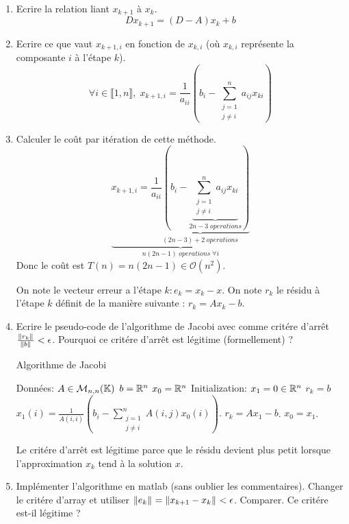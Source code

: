 \documentclass[a4paper,10pt]{article}
\begin{document}
\begin{enumerate}
    \item Ecrire la relation liant $x_{k+1}$ à $x_k$.
\[
Dx_{k + 1} = (D - A)x_k + b
\]

    \item Ecrire ce que vaut $x_{k+1,i}$ en fonction de $x_{k,i}$ (où $x_{k,i}$ représente la
composante $i$ à l'étape $k$).
\[
\forall i \in \llbracket 1, n \rrbracket, \;
x_{k + 1, i} = \frac{1}{a_{ii}}\left( b_i -
\sum_{\substack{
   j = 1 \\
   j \neq i
  }}^n a_{ij} x_{ki} \right)
\]

    \item Calculer le coût par itération de cette méthode.
\[
\underbrace{x_{k + 1, i} = \underbrace{\frac{1}{a_{ii}}\left( b_i -
\underbrace{\sum_{\substack{
   j = 1 \\
   j \neq i
  }}^n a_{ij} x_{ki}}_{2n - 3\; operations} \right)}_{(2n - 3) + 2\; operations}
}_{n(2n - 1)\; operations\; \forall i}
\]
Donc le coût est $T(n) = n (2n - 1) \in \mathcal{O}(n^2)$.

\hbox{}

On note le vecteur erreur a l’étape $k : e_k = x_k − x$. On note $r_k$ le résidu à l’étape $k$
définit de la manière suivante : $r_k = Ax_k − b$.

    \item Ecrire le pseudo-code de l'algorithme de Jacobi avec comme critére
    d'arrêt $\frac{\lVert r_k\rVert_{}}{\lVert b\rVert_{}} < \epsilon$. Pourquoi ce critére d'arrêt est
    légitime (formellement) ?

\begin{algorithm}
\caption{Algorithme de Jacobi}
\begin{algorithmic}
\STATE Données:
\STATE $A \in \mathcal{M}_{n, n}(\mathbb{K})$
\STATE $b = \mathbb{R}^n$
\STATE $x_0 = \mathbb{R}^n$
\STATE Initialization:
\STATE $x_1 = 0 \in \mathbb{R}^n$
\STATE $r_k = b$
    \STATE $x_1(i) = \frac{1}{A(i, i)}\left( b_i - \sum_{\substack{
        j = 1 \\
        j \neq i
        }}^n A(i, j) x_0(i) \right).$
    \STATE $r_k = Ax_1 - b$.
    \STATE $x_0 = x_1$.
\ENDWHILE
\end{algorithmic}
\end{algorithm}

    Le critére d'arrêt est légitime parce que le résidu devient plus petit lorsque
    l'approximation $x_k$ tend à la solution $x$.

    \item Implémenter l'algorithme en matlab (sans oublier les commentaires).
    Changer le critére d'array et utiliser $\lVert e_k\rVert_{} = \lVert x_{k + 1} - x_k\rVert_{}
    < \epsilon$. Comparer. Ce critére est-il légitime ?


\end{enumerate}
\end{document}
